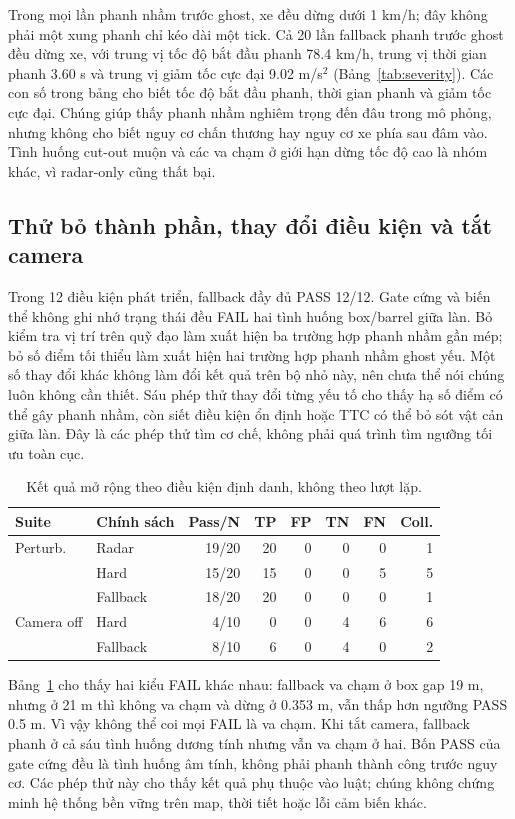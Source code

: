 \documentclass[conference]{IEEEtran}
\begin{document}
Trong mọi lần phanh nhầm trước ghost, xe đều dừng dưới 1 km/h; đây không phải
một xung phanh chỉ kéo dài một tick. Cả 20 lần fallback phanh trước ghost đều
dừng xe, với trung vị tốc độ bắt đầu phanh 78.4 km/h, trung vị thời gian phanh
3.60 s và trung vị giảm tốc cực đại 9.02 m/s$^2$ (Bảng~\ref{tab:severity}). Các con số trong bảng cho biết tốc độ bắt
đầu phanh, thời gian phanh và giảm tốc cực đại. Chúng giúp thấy phanh nhầm
nghiêm trọng đến đâu trong mô phỏng, nhưng không cho biết nguy cơ chấn thương
hay nguy cơ xe phía sau đâm vào. Tình huống cut-out muộn và các va chạm ở giới
hạn dừng tốc độ cao là nhóm khác, vì radar-only cũng thất bại.

\subsection{Thử bỏ thành phần, thay đổi điều kiện và tắt camera}
Trong 12 điều kiện phát triển, fallback đầy đủ PASS 12/12. Gate cứng và biến
thể không ghi nhớ trạng thái đều FAIL hai tình huống box/barrel giữa làn. Bỏ
kiểm tra vị trí trên quỹ đạo làm xuất hiện ba trường hợp phanh nhầm gần mép;
bỏ số điểm tối thiểu làm xuất hiện hai trường hợp phanh nhầm ghost yếu.
Một số thay đổi khác không làm đổi kết quả trên bộ nhỏ này, nên chưa thể nói
chúng luôn không cần thiết. Sáu phép thử thay đổi từng yếu tố cho thấy hạ số
điểm có thể gây phanh nhầm, còn siết điều kiện ổn định hoặc TTC có thể bỏ sót
vật cản giữa làn. Đây là các phép thử tìm cơ chế, không phải quá trình tìm
ngưỡng tối ưu toàn cục.

\begin{table}[t]
\caption{Kết quả mở rộng theo điều kiện định danh, không theo lượt lặp.}
\label{tab:extended}
\centering\scriptsize
\setlength{\tabcolsep}{3pt}
\begin{tabular}{llrrrrrr}
\toprule Suite & Chính sách & Pass/N & TP & FP & TN & FN & Coll.\\ \midrule
Perturb. & Radar & 19/20 & 20 & 0 & 0 & 0 & 1\\
 & Hard & 15/20 & 15 & 0 & 0 & 5 & 5\\
 & Fallback & 18/20 & 20 & 0 & 0 & 0 & 1\\
\midrule
Camera off & Hard & 4/10 & 0 & 0 & 4 & 6 & 6\\
 & Fallback & 8/10 & 6 & 0 & 4 & 0 & 2\\
\bottomrule
\end{tabular}
\end{table}

Bảng~\ref{tab:extended} cho thấy hai kiểu FAIL khác nhau: fallback va chạm ở
box gap 19 m, nhưng ở 21 m thì không va chạm và dừng ở 0.353 m, vẫn thấp hơn
ngưỡng PASS 0.5 m. Vì vậy không thể coi mọi FAIL là va chạm. Khi tắt camera,
fallback phanh ở cả sáu tình huống dương tính nhưng vẫn va chạm ở hai. Bốn
PASS của gate cứng đều là tình huống âm tính, không phải phanh thành công
trước nguy cơ. Các phép thử này cho thấy kết quả phụ thuộc vào luật; chúng
không chứng minh hệ thống bền vững trên map, thời tiết hoặc lỗi cảm biến khác.
\end{document}
